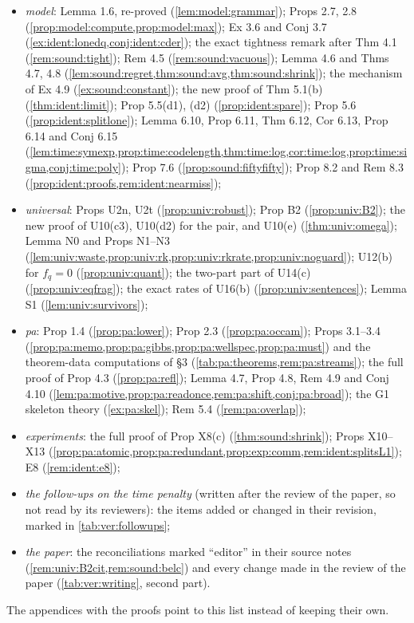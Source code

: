 \begin{itemize}[leftmargin=*,itemsep=1pt]
\item \emph{model}: Lemma 1.6, re-proved (\cref{lem:model:grammar}); Props 2.7, 2.8 (\cref{prop:model:compute,prop:model:max}); Ex 3.6 and Conj 3.7 (\cref{ex:ident:lonedq,conj:ident:cder}); the exact tightness remark after Thm 4.1 (\cref{rem:sound:tight}); Rem 4.5 (\cref{rem:sound:vacuous}); Lemma 4.6 and Thms 4.7, 4.8 (\cref{lem:sound:regret,thm:sound:avg,thm:sound:shrink}); the mechanism of Ex 4.9 (\cref{ex:sound:constant}); the new proof of Thm 5.1(b) (\cref{thm:ident:limit}); Prop 5.5(d1), (d2) (\cref{prop:ident:spare}); Prop 5.6 (\cref{prop:ident:splitlone}); Lemma 6.10, Prop 6.11, Thm 6.12, Cor 6.13, Prop 6.14 and Conj 6.15 (\cref{lem:time:symexp,prop:time:codelength,thm:time:log,cor:time:log,prop:time:sigma,conj:time:poly}); Prop 7.6 (\cref{prop:sound:fiftyfifty}); Prop 8.2 and Rem 8.3 (\cref{prop:ident:proofs,rem:ident:nearmiss});
\item \emph{universal}: Props U2n, U2t (\cref{prop:univ:robust}); Prop B2 (\cref{prop:univ:B2}); the new proof of U10(c3), U10(d2) for the pair, and U10(e) (\cref{thm:univ:omega}); Lemma N0 and Props N1--N3 (\cref{lem:univ:waste,prop:univ:rk,prop:univ:rkrate,prop:univ:noguard}); U12(b) for $f_q=0$ (\cref{prop:univ:quant}); the two-part part of U14(c) (\cref{prop:univ:eqfrag}); the exact rates of U16(b) (\cref{prop:univ:sentences}); Lemma S1 (\cref{lem:univ:survivors});
\item \emph{pa}: Prop 1.4 (\cref{prop:pa:lower}); Prop 2.3 (\cref{prop:pa:occam}); Props 3.1--3.4 (\cref{prop:pa:memo,prop:pa:gibbs,prop:pa:wellspec,prop:pa:must}) and the theorem-data computations of \S3 (\cref{tab:pa:theorems,rem:pa:streams}); the full proof of Prop 4.3 (\cref{prop:pa:refl}); Lemma 4.7, Prop 4.8, Rem 4.9 and Conj 4.10 (\cref{lem:pa:motive,prop:pa:readonce,rem:pa:shift,conj:pa:broad}); the G1 skeleton theory (\cref{ex:pa:skel}); Rem 5.4 (\cref{rem:pa:overlap});
\item \emph{experiments}: the full proof of Prop X8(c) (\cref{thm:sound:shrink}); Props X10--X13 (\cref{prop:pa:atomic,prop:pa:redundant,prop:exp:comm,rem:ident:splitsL1}); E8 (\cref{rem:ident:e8});
\item \emph{the follow-ups on the time penalty} (written after the review of the paper, so not read by its reviewers): the items added or changed in their revision, marked in \cref{tab:ver:followups};
\item \emph{the paper}: the reconciliations marked ``editor'' in their source notes (\cref{rem:univ:B2cit,rem:sound:belc}) and every change made in the review of the paper (\cref{tab:ver:writing}, second part).
\end{itemize}
The appendices with the proofs point to this list instead of keeping their own.

